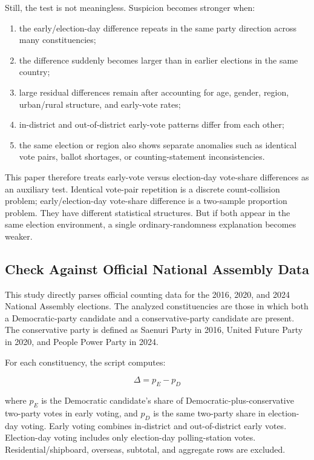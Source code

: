 \documentclass[preprint]{../ieie/IEIE}
\begin{document}
Still, the test is not meaningless. Suspicion becomes stronger when:

\begin{enumerate}
\item the early/election-day difference repeats in the same party direction across many constituencies;
\item the difference suddenly becomes larger than in earlier elections in the same country;
\item large residual differences remain after accounting for age, gender, region, urban/rural structure, and early-vote rates;
\item in-district and out-of-district early-vote patterns differ from each other;
\item the same election or region also shows separate anomalies such as identical vote pairs, ballot shortages, or counting-statement inconsistencies.
\end{enumerate}

This paper therefore treats early-vote versus election-day vote-share differences as an auxiliary test. Identical vote-pair repetition is a discrete count-collision problem; early/election-day vote-share difference is a two-sample proportion problem. They have different statistical structures. But if both appear in the same election environment, a single ordinary-randomness explanation becomes weaker.

\subsection{Check Against Official National Assembly Data}

This study directly parses official counting data for the 2016, 2020, and 2024 National Assembly elections. The analyzed constituencies are those in which both a Democratic-party candidate and a conservative-party candidate are present. The conservative party is defined as Saenuri Party in 2016, United Future Party in 2020, and People Power Party in 2024.

For each constituency, the script computes:

\[
\Delta = p_E - p_D
\]

where \(p_E\) is the Democratic candidate's share of Democratic-plus-conservative two-party votes in early voting, and \(p_D\) is the same two-party share in election-day voting. Early voting combines in-district and out-of-district early votes. Election-day voting includes only election-day polling-station votes. Residential/shipboard, overseas, subtotal, and aggregate rows are excluded.
\end{document}
